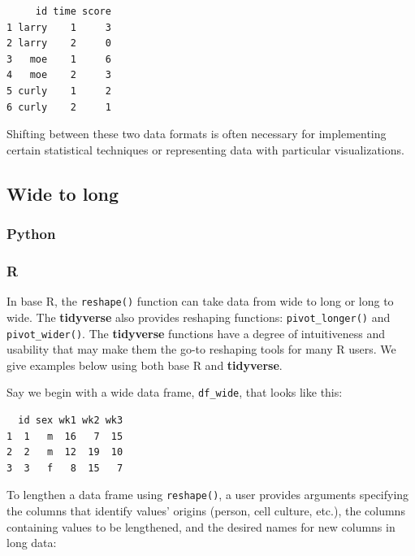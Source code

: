 \documentclass[
]{book}
\begin{document}
\begin{verbatim}
     id time score
1 larry    1     3
2 larry    2     0
3   moe    1     6
4   moe    2     3
5 curly    1     2
6 curly    2     1
\end{verbatim}

Shifting between these two data formats is often necessary for implementing certain statistical techniques or representing data with particular visualizations.

\hypertarget{wide-to-long}{%
\subsection{Wide to long}\label{wide-to-long}}

\hypertarget{python-30}{%
\subsubsection*{Python}\label{python-30}}

\hypertarget{r-30}{%
\subsubsection*{R}\label{r-30}}

In base R, the \texttt{reshape()} function can take data from wide to long or long to wide. The \textbf{tidyverse} also provides reshaping functions: \texttt{pivot\_longer()} and \texttt{pivot\_wider()}. The \textbf{tidyverse} functions have a degree of intuitiveness and usability that may make them the go-to reshaping tools for many R users. We give examples below using both base R and \textbf{tidyverse}.

Say we begin with a wide data frame, \texttt{df\_wide}, that looks like this:

\begin{verbatim}
  id sex wk1 wk2 wk3
1  1   m  16   7  15
2  2   m  12  19  10
3  3   f   8  15   7
\end{verbatim}

To lengthen a data frame using \texttt{reshape()}, a user provides arguments specifying the columns that identify values' origins (person, cell culture, etc.), the columns containing values to be lengthened, and the desired names for new columns in long data:
\end{document}
